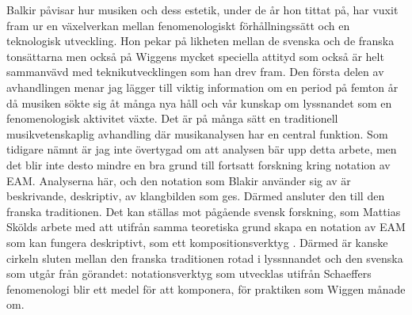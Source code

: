 \documentclass[11pt]{article}
\begin{document}
Balkir påvisar hur musiken och dess estetik, under de år hon tittat på, har vuxit fram ur en växelverkan mellan fenomenologiskt förhållningssätt och en teknologisk utveckling. Hon pekar på likheten mellan de svenska och de franska tonsättarna men också på Wiggens mycket speciella attityd som också är helt sammanvävd med teknikutvecklingen som han drev fram. Den första delen av avhandlingen menar jag lägger till viktig information om en period på femton år då musiken sökte sig åt många nya håll och vår kunskap om lyssnandet som en fenomenologisk aktivitet växte. Det är på många sätt en traditionell musikvetenskaplig avhandling där musikanalysen har en central funktion. Som tidigare nämnt är jag inte övertygad om att analysen bär upp detta arbete, men det blir inte desto mindre en bra grund till fortsatt forskning kring notation av EAM. Analyserna här, och den notation som Blakir använder sig av är beskrivande, deskriptiv, av klangbilden som ges. Därmed ansluter den till den franska traditionen. Det kan ställas mot pågående svensk forskning, som Mattias Skölds arbete med att utifrån samma teoretiska grund skapa en notation av EAM som kan fungera deskriptivt, som ett kompositionsverktyg \citep{skold2019}. Därmed är kanske cirkeln sluten mellan den franska traditionen rotad i lyssnnandet och den svenska som utgår från görandet: notationsverktyg som utvecklas utifrån Schaeffers fenomenologi blir ett medel för att komponera, för praktiken som Wiggen månade om.


\printbibliography[title=\{Referenser\}]
\end{document}

